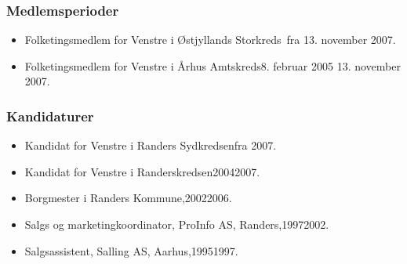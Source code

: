 \documentclass[11pt, a4paper]{awesome-cv}
\begin{document}
\begin{cvletter}
\subsubsection*{Medlemsperioder}
\begin{itemize}
\item Folketingsmedlem for Venstre i Østjyllands Storkreds fra 13. november 2007.
\item Folketingsmedlem for Venstre i Århus Amtskreds8. februar 2005  13. november 2007.
\end{itemize}
\subsubsection*{Kandidaturer}
\begin{itemize}
\item Kandidat for Venstre i Randers Sydkredsenfra 2007.
\item Kandidat for Venstre i Randerskredsen20042007.
\end{itemize}
\begin{itemize}
\item Borgmester i Randers Kommune,20022006.
\item Salgs og marketingkoordinator, ProInfo AS, Randers,19972002.
\item Salgsassistent, Salling AS, Aarhus,19951997.
\end{itemize}
\end{cvletter}
\end{document}
